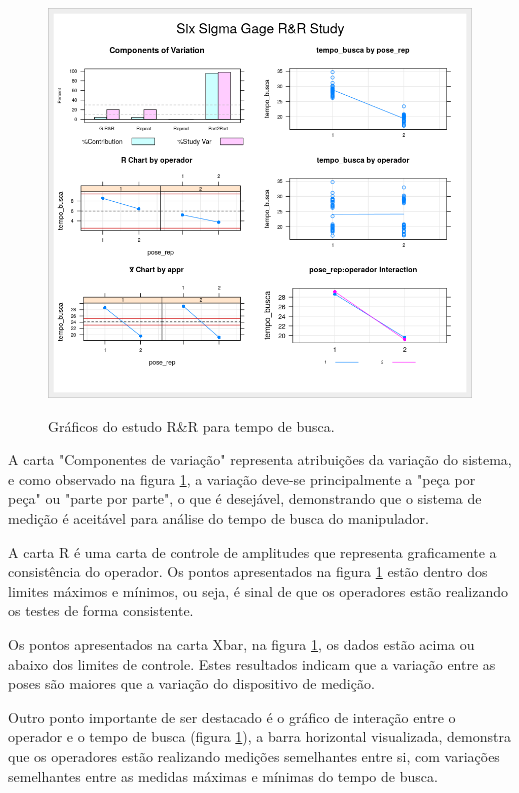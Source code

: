\begin{figure}[H]
  \caption{Gráficos do estudo R\&R para tempo de busca.}
  \centering
  \includegraphics[scale=0.7]{images/rr_bus.png}
  \label{fig:rr3}
\end{figure}

A carta "Componentes de variação" representa atribuições da variação do sistema, e como observado na figura \ref*{fig:rr3}, a variação deve-se principalmente a "peça por peça" ou "parte por parte", o que é desejável, demonstrando que o sistema de medição é aceitável para análise do tempo de busca do manipulador. 

A carta R é uma carta de controle de amplitudes que representa graficamente a consistência do operador. Os pontos apresentados na figura \ref*{fig:rr3} estão dentro dos limites máximos e mínimos, ou seja, é sinal de que os operadores estão realizando os testes de forma consistente.

Os pontos apresentados na carta Xbar, na figura \ref*{fig:rr3}, os dados estão acima ou abaixo dos limites de controle. Estes resultados indicam que a variação
entre as poses são maiores que a variação do dispositivo de medição. 

Outro ponto importante de ser destacado é o gráfico de interação entre o operador e o tempo de busca (figura \ref*{fig:rr3}), a barra horizontal visualizada, demonstra que os operadores estão realizando medições semelhantes entre si, com variações semelhantes entre as medidas máximas e mínimas do tempo de busca. 



